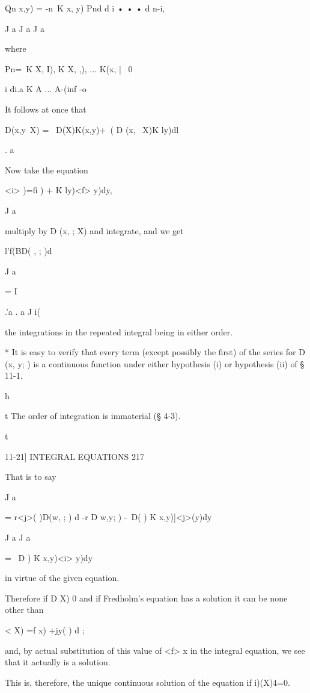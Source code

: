 Qn x,y) = -n\ K x, y) Pnd d i • • • d n-i,

J a J a J a

where

Pn=\ K X, I), K X, ,), ... K(x, | \ 0

i di.a K A ... A-(inf -o



It follows at once that

D(x,y\ X) = \ D(X)K(x,y)+\ ( D (x, \ X)K ly)dl

. a

Now take the equation

<i> )=fi ) + \' K ly)<f> y)dy,

J a

multiply by D (x, ; X) and integrate, and we get

l'f(BD( , ; )d

J a

= I %

.'a . a J i(

the integrations in the repeated integral being in either order.

* It is easy to verify that every term (except possibly the first) of
the series for D (x, y; ) is a continuous function under either
hypothesis (i) or hypothesis (ii) of § 11-1.

h



t The order of integration is immaterial (§ 4-3).



t



11-21] INTEGRAL EQUATIONS 217

That is to say

J a

= r<j>( )D(w, ; ) d -r D w,y; ) -\ D( ) K x,y)]<j>(y)dy

J a J a

= \ D ) \' K x,y)<i> y)dy

in virtue of the given equation.

Therefore if D X) 0 and if Fredholm's equation has a solution it can
be none other than

< X) =f x) +jy( ) d ;

and, by actual substitution of this value of <f> x in the integral
equation, we see that it actually is a solution.

This is, therefore, the unique continuous solution of the equation if
i)(X)4=0.

